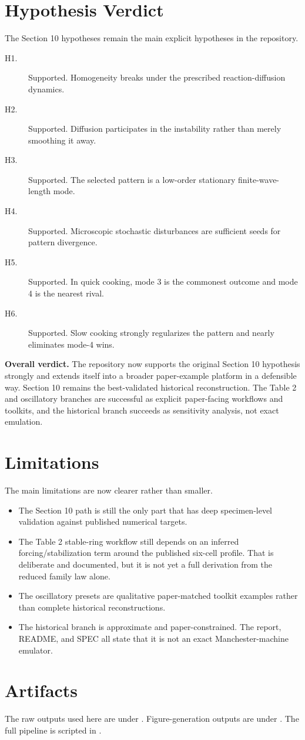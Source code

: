 \documentclass[11pt]{article}
\begin{document}
\section*{Hypothesis Verdict}
The Section 10 hypotheses remain the main explicit hypotheses in the repository.

\begin{description}
    \item[H1.] Supported. Homogeneity breaks under the prescribed reaction-diffusion dynamics.
    \item[H2.] Supported. Diffusion participates in the instability rather than merely smoothing it away.
    \item[H3.] Supported. The selected pattern is a low-order stationary finite-wave-length mode.
    \item[H4.] Supported. Microscopic stochastic disturbances are sufficient seeds for pattern divergence.
    \item[H5.] Supported. In quick cooking, mode 3 is the commonest outcome and mode 4 is the nearest rival.
    \item[H6.] Supported. Slow cooking strongly regularizes the pattern and nearly eliminates mode-4 wins.
\end{description}

\noindent\textbf{Overall verdict.} The repository now supports the original Section 10 hypothesis strongly and extends itself into a broader paper-example platform in a defensible way. Section 10 remains the best-validated historical reconstruction. The Table 2 and oscillatory branches are successful as explicit paper-facing workflows and toolkits, and the historical branch succeeds as sensitivity analysis, not exact emulation.

\section*{Limitations}
The main limitations are now clearer rather than smaller.
\begin{itemize}
    \item The Section 10 path is still the only part that has deep specimen-level validation against published numerical targets.
    \item The Table 2 stable-ring workflow still depends on an inferred forcing/stabilization term around the published six-cell profile. That is deliberate and documented, but it is not yet a full derivation from the reduced family law alone.
    \item The oscillatory presets are qualitative paper-matched toolkit examples rather than complete historical reconstructions.
    \item The historical branch is approximate and paper-constrained. The report, README, and SPEC all state that it is not an exact Manchester-machine emulator.
\end{itemize}

\section*{Artifacts}
The raw outputs used here are under . Figure-generation outputs are under . The full pipeline is scripted in .
\end{document}
